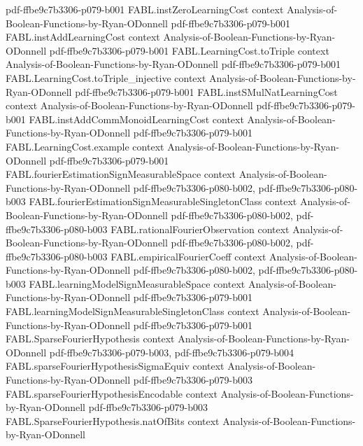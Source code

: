 \begin{theorem}
  {pdf-ffbe9c7b3306-p079-b001}
\proofstep
  {FABL.instZeroLearningCost}
  {context}
  {Analysis-of-Boolean-Functions-by-Ryan-ODonnell}
  {pdf-ffbe9c7b3306-p079-b001}
\proofstep
  {FABL.instAddLearningCost}
  {context}
  {Analysis-of-Boolean-Functions-by-Ryan-ODonnell}
  {pdf-ffbe9c7b3306-p079-b001}
\proofstep
  {FABL.LearningCost.toTriple}
  {context}
  {Analysis-of-Boolean-Functions-by-Ryan-ODonnell}
  {pdf-ffbe9c7b3306-p079-b001}
\proofstep
  {FABL.LearningCost.toTriple_injective}
  {context}
  {Analysis-of-Boolean-Functions-by-Ryan-ODonnell}
  {pdf-ffbe9c7b3306-p079-b001}
\proofstep
  {FABL.instSMulNatLearningCost}
  {context}
  {Analysis-of-Boolean-Functions-by-Ryan-ODonnell}
  {pdf-ffbe9c7b3306-p079-b001}
\proofstep
  {FABL.instAddCommMonoidLearningCost}
  {context}
  {Analysis-of-Boolean-Functions-by-Ryan-ODonnell}
  {pdf-ffbe9c7b3306-p079-b001}
\proofstep
  {FABL.LearningCost.example}
  {context}
  {Analysis-of-Boolean-Functions-by-Ryan-ODonnell}
  {pdf-ffbe9c7b3306-p079-b001}
\proofstep
  {FABL.fourierEstimationSignMeasurableSpace}
  {context}
  {Analysis-of-Boolean-Functions-by-Ryan-ODonnell}
  {pdf-ffbe9c7b3306-p080-b002,
    pdf-ffbe9c7b3306-p080-b003}
\proofstep
  {FABL.fourierEstimationSignMeasurableSingletonClass}
  {context}
  {Analysis-of-Boolean-Functions-by-Ryan-ODonnell}
  {pdf-ffbe9c7b3306-p080-b002,
    pdf-ffbe9c7b3306-p080-b003}
\proofstep
  {FABL.rationalFourierObservation}
  {context}
  {Analysis-of-Boolean-Functions-by-Ryan-ODonnell}
  {pdf-ffbe9c7b3306-p080-b002,
    pdf-ffbe9c7b3306-p080-b003}
\proofstep
  {FABL.empiricalFourierCoeff}
  {context}
  {Analysis-of-Boolean-Functions-by-Ryan-ODonnell}
  {pdf-ffbe9c7b3306-p080-b002,
    pdf-ffbe9c7b3306-p080-b003}
\proofstep
  {FABL.learningModelSignMeasurableSpace}
  {context}
  {Analysis-of-Boolean-Functions-by-Ryan-ODonnell}
  {pdf-ffbe9c7b3306-p079-b001}
\proofstep
  {FABL.learningModelSignMeasurableSingletonClass}
  {context}
  {Analysis-of-Boolean-Functions-by-Ryan-ODonnell}
  {pdf-ffbe9c7b3306-p079-b001}
\proofstep
  {FABL.SparseFourierHypothesis}
  {context}
  {Analysis-of-Boolean-Functions-by-Ryan-ODonnell}
  {pdf-ffbe9c7b3306-p079-b003,
    pdf-ffbe9c7b3306-p079-b004}
\proofstep
  {FABL.sparseFourierHypothesisSigmaEquiv}
  {context}
  {Analysis-of-Boolean-Functions-by-Ryan-ODonnell}
  {pdf-ffbe9c7b3306-p079-b003}
\proofstep
  {FABL.sparseFourierHypothesisEncodable}
  {context}
  {Analysis-of-Boolean-Functions-by-Ryan-ODonnell}
  {pdf-ffbe9c7b3306-p079-b003}
\proofstep
  {FABL.SparseFourierHypothesis.natOfBits}
  {context}
  {Analysis-of-Boolean-Functions-by-Ryan-ODonnell}

\end{theorem}
